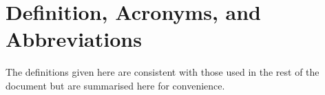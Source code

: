 % 
% 
% 

% 

\section{Definition, Acronyms, and Abbreviations}
\label{sec:reqdefs}
The definitions given here are consistent with those used in the rest of the document but are summarised here for convenience.

